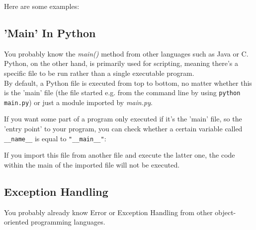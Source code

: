         
      Here are some examples:
      

  \subsection{'Main' In Python}
    You probably know the \textit{main()} method from other languages such as Java or C. \\
    Python, on the other hand, is primarily used for scripting, meaning there's a specific file
    to be run rather than a single executable program. \\
    By default, a Python file is executed from top to bottom, no matter whether this is the
    'main' file (the file started e.g. from the command line by using
    \texttt{python main.py}) or just a module imported by \textit{main.py}.

    If you want some part of a program only executed if it's the 'main' file, so the 'entry point'
    to your program, you can check whether a certain variable called \texttt{__name__}
    is equal to \texttt{"__main__"}:


    If you import this file from another file and execute the latter one, the code within the main
    of the imported file will not be executed.
      
  
  \subsection{Exception Handling}
    You probably already know Error or Exception Handling from other object-oriented
    programming languages.
    
